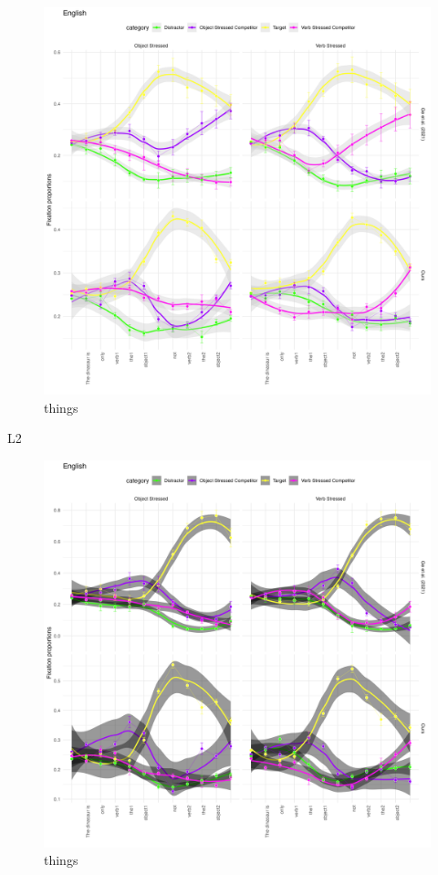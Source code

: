 \begin{figure}[p]  %
    \centering
    \includegraphics[width=\textwidth,height=\textheight,keepaspectratio]{viz/english_fix2.png}
    \caption{things}
    \label{fig:english_fix2}
\end{figure}

L2

\begin{figure}[p]  %
    \centering
    \includegraphics[width=\textwidth,height=\textheight,keepaspectratio]{viz/dutch_fix2.png}
    \caption{things}
    \label{fig:english_fix2}
\end{figure}

